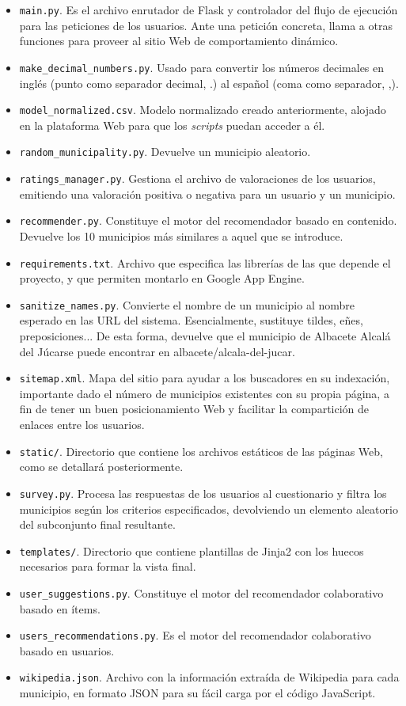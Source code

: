 \begin{itemize}
	\item \texttt{main.py}. Es el archivo enrutador de Flask y controlador del flujo de ejecución para las peticiones de los usuarios. Ante una petición concreta, llama a otras funciones para proveer al sitio Web de comportamiento dinámico.
	\item \texttt{make\_decimal\_numbers.py}. Usado para convertir los números decimales en inglés (punto como separador decimal, \guillemotleft .\guillemotright) al español (coma como separador, \guillemotleft ,\guillemotright).
	\item \texttt{model\_normalized.csv}. Modelo normalizado creado anteriormente, alojado en la plataforma Web para que los \textit{scripts} puedan acceder a él.
	\item \texttt{random\_municipality.py}. Devuelve un municipio aleatorio.
	\item \texttt{ratings\_manager.py}. Gestiona el archivo de valoraciones de los usuarios, emitiendo una valoración positiva o negativa para un usuario y un municipio.
	\item \texttt{recommender.py}. Constituye el motor del recomendador basado en contenido. Devuelve los 10 municipios más similares a aquel que se introduce.
	\item \texttt{requirements.txt}. Archivo que especifica las librerías de las que depende el proyecto, y que permiten montarlo en Google App Engine.
	\item \texttt{sanitize\_names.py}. Convierte el nombre de un municipio al nombre esperado en las URL del sistema. Esencialmente, sustituye tildes, eñes, preposiciones... De esta forma, devuelve que el municipio de Albacete \guillemotleft Alcalá del Júcar\guillemotright\space se puede encontrar en \guillemotleft albacete/alcala-del-jucar\guillemotright.
	\item \texttt{sitemap.xml}. Mapa del sitio para ayudar a los buscadores en su indexación, importante dado el número de municipios existentes con su propia página, a fin de tener un buen posicionamiento Web y facilitar la compartición de enlaces entre los usuarios.
	\item \texttt{static/}. Directorio que contiene los archivos estáticos de las páginas Web, como se detallará posteriormente.
	\item \texttt{survey.py}. Procesa las respuestas de los usuarios al cuestionario y filtra los municipios según los criterios especificados, devolviendo un elemento aleatorio del subconjunto final resultante.
	\item \texttt{templates/}. Directorio que contiene plantillas de Jinja2 con los huecos necesarios para formar la vista final.
	\item \texttt{user\_suggestions.py}. Constituye el motor del recomendador colaborativo basado en ítems.
	\item \texttt{users\_recommendations.py}. Es el motor del recomendador colaborativo basado en usuarios.
	\item \texttt{wikipedia.json}. Archivo con la información extraída de Wikipedia para cada municipio, en formato JSON para su fácil carga por el código JavaScript.

\end{itemize}

